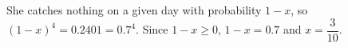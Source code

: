 She catches nothing on a given day with probability $1-x$, so $(1-x)^4=0.2401=0.7^4$. Since $1-x\ge0$, $1-x=0.7$ and $x=\boxed{\dfrac{3}{10}}$.
